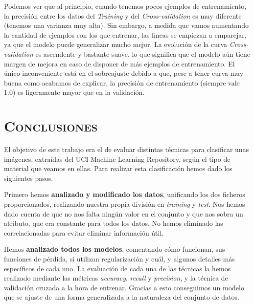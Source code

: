 \documentclass[11pt,a4paper]{article}
\begin{document}
Podemos ver que al principio, cuando tenemos pocos ejemplos de entrenamiento, la precisión entre los datos del \textit{Training} y del
\textit{Cross-validation} es muy diferente (tenemos una varianza muy alta). Sin embargo, a medida que vamos aumentando la cantidad de
ejemplos con los que entrenar, las líneas se empiezan a emparejar, ya que el modelo puede generalizar mucho mejor. La evolución de la curva
\textit{Cross-validation} es ascendente y bastante suave, lo que significa que el modelo aún tiene margen de mejora en caso de disponer de
más ejemplos de entrenamiento. El único inconveniente está en el sobreajuste debido a que, pese a tener curva muy buena como acabamos de
explicar, la precisión de entrenamiento (siempre vale 1.0) es ligeramente mayor que en la validación.

\newpage

\section{\textsc{Conclusiones}}

El objetivo de este trabajo era el de evaluar distintas técnicas para clasificar unas imágenes, extraídas del UCI Machine Learning
Repository, según el tipo de material que veamos en ellas. Para realizar esta clasificación hemos dado los siguientes pasos.

Primero hemos \textbf{analizado y modificado los datos}, unificando los dos ficheros proporcionados, realizando nuestra propia división en
\textit{training} y \textit{test}. Nos hemos dado cuenta de que no nos falta ningún valor en el conjunto y que nos sobra un atributo, que
era constante para todos los datos. No hemos eliminado las correlacionadas para evitar eliminar información útil.

Hemos \textbf{analizado todos los modelos}, comentando cómo funcionan, sus funciones de pérdida, si utilizan regularización y cuál, y algunos
detalles más específicos de cada uno. La evaluación de cada una de las técnicas la hemos realizado mediante las métricas
\textit{accuracy}, \textit{recall} y \textit{precision}, y la técnica de validación cruzada a la hora de entrenar. Gracias a esto
conseguimos un modelo que se ajuste de una forma generalizada a la naturaleza del conjunto de datos.
\end{document}
